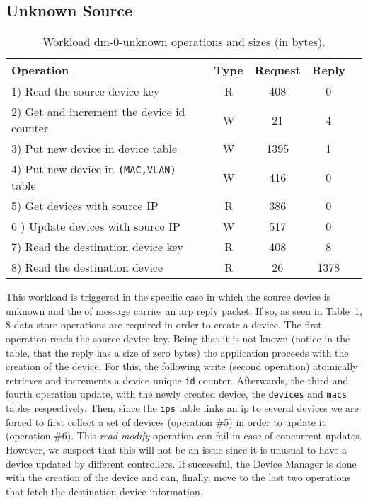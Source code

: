 \subsection{Unknown Source}
\small
\begin{table}[ht]
\centering 
\begin{tabular}{l c c c c}
Operation & Type & Request & Reply \\ \toprule 
1) Read the source device key & R & 408 & 0\\
2) Get and increment the device id counter & W & 21 & 4\\
3) Put new device in device table & W & 1395 & 1\\
4) Put new device in \texttt{(MAC,VLAN)} table & W & 416 & 0\\
5) Get devices with source IP & R & 386 & 0\\
6 ) Update devices with source IP & W & 517 & 0\\
7) Read the destination device key & R & 408 & 8\\
8) Read the destination device & R & 26 & 1378 \\\bottomrule
\end{tabular}
\caption[Workload dm-0-unknown operations]{Workload dm-0-unknown operations
  and sizes (in bytes).}
\label{table:ops:dm-0-unknown}
\end{table}

This workload is triggered in the specific case in which  the source device is unknown and the \gls{of} message carries an \gls{arp} reply 
packet. 
If so, as seen in Table~\ref{table:ops:dm-0-unknown},  8 data store operations are required in order to create a device.  
The first operation reads the  source device key.  
Being that it is not known (notice in the table, that the reply has a size  of zero bytes) the application proceeds with the creation of the device. 
For this, the following write (second operation) atomically retrieves and increments a device unique \texttt{id} counter. 
Afterwards, the third and fourth  operation update, with the newly created device, the \texttt{devices} and \texttt{macs} tables respectively. 
Then, since the \texttt{ips} table links an \gls{ip} to several devices we are forced to first collect a set of devices  (operation \#5) in order to update it (operation \#6).  
This \emph{read-modify} operation can fail in case of concurrent updates.
However, we suspect that this will not be an issue since it is unusual to have a device updated by different controllers.
If successful, the Device Manager is done with the creation of the device and can, finally, move to the last two operations that fetch the destination device information. 


